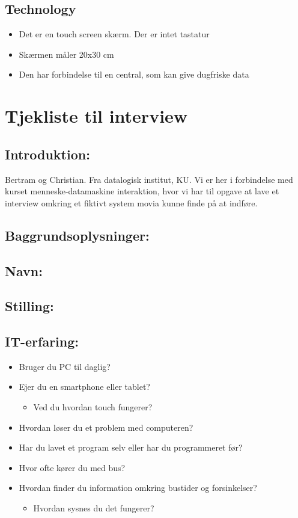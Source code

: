 \documentclass[12pt,a4paper,oneside]{article}
\begin{document}
\subsection{Technology}
\begin{itemize}
\item Det er en touch screen skærm. Der er intet tastatur
\item Skærmen måler 20x30 cm
\item Den har forbindelse til en central, som kan give dugfriske data
\end{itemize}


\section{Tjekliste til interview}
\subsection{Introduktion:}
Bertram og Christian. Fra datalogisk institut, KU. Vi er her i forbindelse med kurset menneske-datamaskine interaktion, hvor vi har til opgave at lave et interview omkring et fiktivt system movia kunne finde på at indføre.
\subsection{Baggrundsoplysninger:}
\subsection{Navn:}
\subsection{Stilling:}
\subsection{IT-erfaring:}
\begin{itemize}
\item Bruger du PC til daglig?
\item Ejer du en smartphone eller tablet?
\begin{itemize}
\item Ved du hvordan touch fungerer?
\end{itemize}
\item Hvordan løser du et problem med computeren?
\item Har du lavet et program selv eller har du programmeret før?
\item Hvor ofte kører du med bus?
\item Hvordan finder du information omkring bustider og forsinkelser?
\begin{itemize}
\item Hvordan sysnes du det fungerer?
\end{itemize}
\end{itemize}
\end{document}
